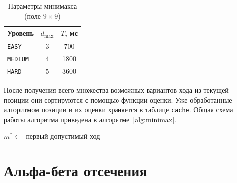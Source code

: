 \documentclass[a4paper,12pt]{diplom}
\begin{document}
\begin{table}[H]
    \centering
    \caption{Параметры минимакса (поле $9\times9$)}
    \label{tab:minimax_params}
    \begin{tabular}{lcc}
        \toprule
        Уровень & $d_{\max}$ & $T$, мс \\
        \midrule
        \texttt{EASY}   & 3 & 700  \\
        \texttt{MEDIUM} & 4 & 1800 \\
        \texttt{HARD}   & 5 & 3600 \\
        \bottomrule
    \end{tabular}
\end{table}

После получения всего множества возможных вариантов хода из текущей позиции они сортируются с помощью функции оценки. Уже обработанные алгоритмом позиции и их оценки храняется в таблице \texttt{cache}. Общая схема работы алгоритма приведена в алгоритме~\ref{alg:minimax}.

\begin{algorithm}[H]
\caption{Минимакс с итеративным углублением}\label{alg:minimax}
\BlankLine
$m^* \leftarrow$ первый допустимый ход\;
\end{algorithm}

\section{Альфа-бета отсечения}
\end{document}
